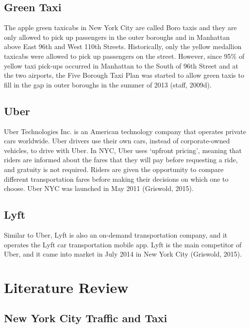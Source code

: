 \documentclass[12pt,twoside]{reedthesis}
\theoremstyle{definition}
\theoremstyle{definition}
\theoremstyle{definition}
\theoremstyle{remark}
\begin{document}
\subsection{Green Taxi}\label{green-taxi}

The apple green taxicabs in New York City are called Boro taxis and they
are only allowed to pick up passengers in the outer boroughs and in
Manhattan above East 96th and West 110th Streets. Historically, only the
yellow medallion taxicabs were allowed to pick up passengers on the
street. However, since 95\% of yellow taxi pick-ups occurred in
Manhattan to the South of 96th Street and at the two airports, the Five
Borough Taxi Plan was started to allow green taxis to fill in the gap in
outer boroughs in the summer of 2013 (staff, 2009d).

\subsection{Uber}\label{uber}

Uber Technologies Inc. is an American technology company that operates
private cars worldwide. Uber drivers use their own cars, instead of
corporate-owned vehicles, to drive with Uber. In NYC, Uber uses `upfront
pricing', meaning that riders are informed about the fares that they
will pay before requesting a ride, and gratuity is not required. Riders
are given the opportunity to compare different transportation fares
before making their decisions on which one to choose. Uber NYC was
launched in May 2011 (Griswold, 2015).

\subsection{Lyft}\label{lyft}

Similar to Uber, Lyft is also an on-demand transportation company, and
it operates the Lyft car transportation mobile app. Lyft is the main
competitor of Uber, and it came into market in July 2014 in New York
City (Griswold, 2015).

\section{Literature Review}\label{literature-review}

\subsection{New York City Traffic and
Taxi}\label{new-york-city-traffic-and-taxi}
\end{document}
